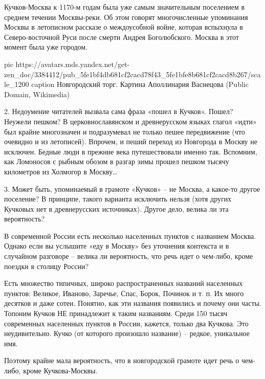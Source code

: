 Кучков-Москва к 1170-м годам была уже самым значительным поселением в среднем
течении Москвы-реки. Об этом говорят многочисленные упоминания Москвы в
летописном рассказе о междоусобной войне, которая вспыхнула в Северо-восточной
Руси после смерти Андрея Боголюбского. Москва в этот момент была уже городом.

\ifcmt
pic https://avatars.mds.yandex.net/get-zen_doc/3384412/pub_5fe1bf4db681cf2cacd78f43_5fe1bfe8b681cf2cacd8b267/scale_1200
caption Новгородский торг. Картина Аполлинария Васнецова (Public Domain, Wikimedia)
\fi

2. Недоумение читателей вызвала сама фраза «пошел в Кучков». Пошел? Неужели
пешком? В церковнославянском и древнерусском языках глагол «идти» был крайне
многозначен и подразумевал не только пешее передвижение (что очевидно и из
летописей). Впрочем, и пеший переход из Новгорода в Москву не исключен. Бедные
люди в прежние века путешествовали именно так. Вспомним, как Ломоносов с рыбным
обозом в разгар зимы прошел пешком тысячу километров из Холмогор в Москву…

3. Может быть, упоминаемый в грамоте «Кучков» – не Москва, а какое-то другое
поселение? В принципе, такого варианта исключить нельзя (хотя других Кучковых
нет в древнерусских источниках). Другое дело, велика ли эта вероятность?

В современной России есть несколько населенных пунктов с названием Москва.
Однако если вы услышите «еду в Москву» без уточнения контекста и в случайном
разговоре – велика ли вероятность, что речь идет о чем-либо, кроме поездки в
столицу России?

Есть множество типичных, широко распространенных названий населенных пунктов:
Великое, Иваново, Заречье, Спас, Борок, Починок и т. п. Их много десятков и
даже сотен. Понятно, как эти названия появились и почему они часты. Топоним
Кучков НЕ принадлежит к таким названиям. Среди 150 тысяч современных населенных
пунктов в России, кажется, только два Кучкова. Это неудивительно. Кучко (от
которого произошло название) – редкое, уникальное имя.

Поэтому крайне мала вероятность, что в новгородской грамоте идет речь о
чем-либо, кроме Кучкова-Москвы.
